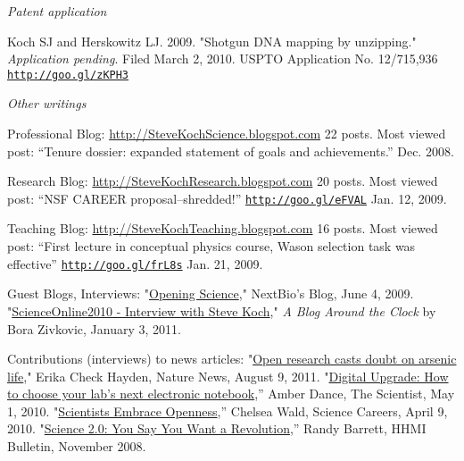 \documentclass[11pt]{article}
\begin{document}

\bigskip 
 
\noindent\emph{Patent application \vspace{0.05in}}

\ind Koch SJ and Herskowitz LJ. 2009. "Shotgun DNA mapping by unzipping." \emph{Application pending}. Filed March 2, 2010. USPTO  Application No. 12/715,936 {\scriptsize  \texttt{\href{http://goo.gl/zKPH3}{http://goo.gl/zKPH3}}}


\bigskip 
\noindent\emph{Other writings \vspace{0.05in}}


\ind Professional Blog: \href{http://goo.gl/5GKbQ}{http://SteveKochScience.blogspot.com}  22 posts. Most viewed post: “Tenure dossier: expanded statement of goals and achievements.”  Dec. 2008.

\ind Research Blog: \href{http://goo.gl/yB68J}{http://SteveKochResearch.blogspot.com} 20 posts. Most viewed post: “NSF CAREER proposal–shredded!” {\scriptsize  \texttt{\href{http://goo.gl/eFVAL}{http://goo.gl/eFVAL}}} Jan. 12, 2009.

\ind Teaching Blog: \href{http://goo.gl/m8sfa}{http://SteveKochTeaching.blogspot.com} 16 posts. Most viewed post: “First lecture in conceptual physics course, Wason selection task was effective” {\scriptsize  \texttt{\href{http://goo.gl/frL8s}{http://goo.gl/frL8s}}} Jan. 21, 2009.

\ind Guest Blogs, Interviews: "\href{http://goo.gl/5jvJY}{Opening Science}," NextBio's Blog, June 4, 2009. "\href{http://goo.gl/qvAuU}{ScienceOnline2010 - Interview with Steve Koch}," \emph{A Blog Around the Clock} by Bora Zivkovic, January 3, 2011.

\ind Contributions (interviews) to news articles: "\href{http://goo.gl/N8INQ}{Open research casts doubt on arsenic life}," Erika Check Hayden, Nature News, August 9, 2011. "\href{http://goo.gl/bQOom}{Digital Upgrade: How to choose your lab’s next electronic notebook},” Amber Dance, The Scientist, May 1, 2010. "\href{http://goo.gl/QEtg7}{Scientists Embrace Openness},” Chelsea Wald, Science Careers, April 9, 2010. "\href{http://goo.gl/Dx9WU}{Science 2.0: You Say You Want a Revolution},” Randy Barrett, HHMI Bulletin, November 2008.   
\end{document}
